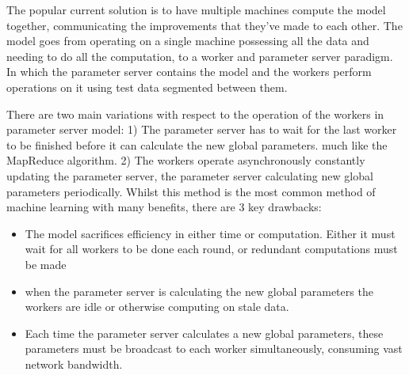 
The popular current solution is to have multiple machines compute the model
together, communicating the improvements that they've made to each other. The
model goes from operating on a single machine possessing all the data and
needing to do all the computation, to a worker and parameter server paradigm. In
which the parameter server contains the model and the workers perform operations
on it using test data segmented between them. \cite{ParameterServers}
\par

There are two main variations with respect to the operation of the workers in
parameter server model: 1) The parameter server has to wait for the last worker
to be finished before it can calculate the new global parameters. much like the
MapReduce algorithm. \cite{googlemapreduce2008} 2) The workers operate
asynchronously constantly updating the parameter server, the parameter server
calculating new global parameters periodically.  \cite{Qirong2013SSP} Whilst
this method is the most common method of machine learning with many benefits,
there are 3 key drawbacks:
\begin{itemize}
    \item The model sacrifices efficiency in either time or computation. Either
    it must wait for all workers to be done each round, or redundant
    computations must be made
    \item when the parameter server is calculating the new global parameters the
    workers are idle or otherwise computing on stale data.
    \item Each time the parameter server calculates a new global parameters,
    these parameters must be broadcast to each worker simultaneously, consuming vast network bandwidth.
\end{itemize}

